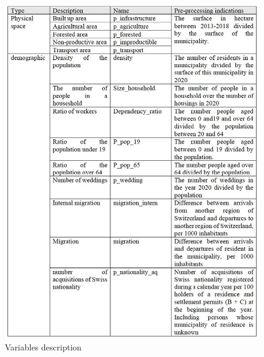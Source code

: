 \documentclass[
]{article}
\begin{document}
\begin{figure}

{\centering \includegraphics[width=1\linewidth,height=1\textheight]{images/Variables1} 

}

\caption{Variables description \label{Variables}}\label{fig:variables-1}
\end{figure}
\end{document}
